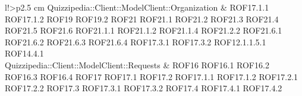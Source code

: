 \begin{tabella}{l!{\VRule}>{\centering\arraybackslash}p{2.5 cm}}
Quizzipedia::Client::ModelClient::Organization & ROF17.1.1 \linebreak ROF17.1.2 \linebreak ROF19 \linebreak ROF19.2 \linebreak ROF21 \linebreak ROF21.1 \linebreak ROF21.2 \linebreak ROF21.3 \linebreak ROF21.4 \linebreak ROF21.5 \linebreak ROF21.6 \linebreak ROF21.1.1 \linebreak ROF21.1.2 \linebreak ROF21.1.4 \linebreak ROF21.2.2 \linebreak ROF21.6.1 \linebreak ROF21.6.2 \linebreak ROF21.6.3 \linebreak ROF21.6.4 \linebreak ROF17.3.1 \linebreak ROF17.3.2 \linebreak ROF12.1.1.5.1 \linebreak ROF14.4.1 \\
Quizzipedia::Client::ModelClient::Requests & ROF16 \linebreak ROF16.1 \linebreak ROF16.2 \linebreak ROF16.3 \linebreak ROF16.4 \linebreak ROF17 \linebreak ROF17.1 \linebreak ROF17.2 \linebreak ROF17.1.1 \linebreak ROF17.1.2 \linebreak ROF17.2.1 \linebreak ROF17.2.2 \linebreak ROF17.3 \linebreak ROF17.3.1 \linebreak ROF17.3.2 \linebreak ROF17.4 \linebreak ROF17.4.1 \linebreak ROF17.4.2 \\

\end{tabella}
